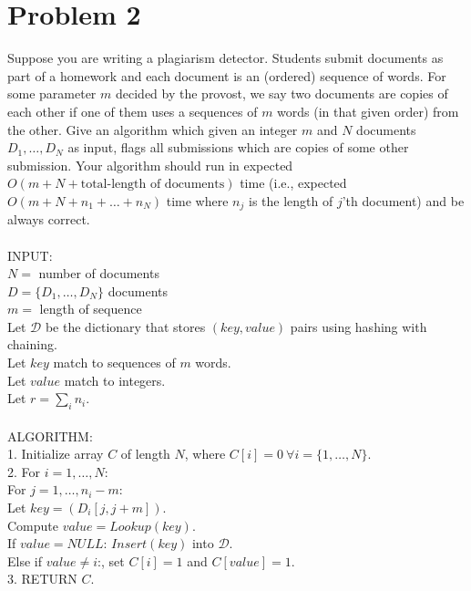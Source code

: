 \documentclass[10pt,letterpaper]{article}
\newcommand\tab[1][0.5cm]{\hspace*{#1}}
\begin{document}
\section{Problem 2}
Suppose you are writing a plagiarism detector. Students submit documents as part of a homework and each document is an (ordered) sequence of words. For some parameter $m$ decided by the provost, we say two documents are copies of each other if one of them uses a sequences of $m$ words (in that given order) from the other. Give an algorithm which given an integer $m$ and $N$ documents $D_1,\ldots,D_N$ as input, flags all submissions which are copies of some other submission. Your algorithm should run in expected $O(m + N + \text{total-length of documents})$ time (i.e., expected $O( m + N + n_1 + \ldots + n_N)$ time where $n_j$ is the length of $j$'th document) and be always correct.\\\\
INPUT:\\
$N = $ number of documents\\
$D = \{D_1,\dots,D_N\}$ documents\\
$m = $ length of sequence\\
Let $\mathcal{D}$ be the dictionary that stores $(key,value)$ pairs using hashing with chaining.\\
Let $key$ match to sequences of $m$ words.\\
Let $value$ match to integers.\\
Let $r = \sum_{i}n_i$.\\\\
\textsc{ALGORITHM}:\\
1. Initialize array $C$ of length $N$, where $C[i]=0 \ \forall i=\{1,\dots,N\}$.\\
2. For $i = 1,\dots,N$:\\
\tab For $j = 1,\dots,n_i-m$:\\
\tab \tab Let $key = (D_i[j,j+m])$.\\
\tab \tab Compute $value = Lookup(key)$.\\
\tab \tab If $value = NULL$: $Insert(key)$ into $\mathcal{D}$.\\
\tab \tab Else if $value\neq i$:, set $C[i]=1$ and $C[value]=1$.\\
3. \textsc{RETURN} $C$.\\

\pagebreak

\end{document}
